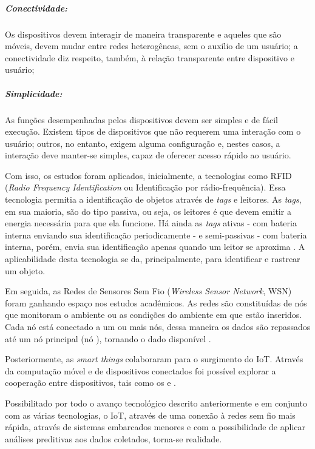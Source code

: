 \subparagraph{Conectividade:} 

Os dispositivos devem interagir de maneira transparente
e aqueles que são móveis, devem mudar entre redes heterogêneas, sem o 
auxílio de um usuário; a conectividade diz respeito, também, à relação 
transparente entre dispositivo e usuário; 

\subparagraph{Simplicidade:} 

As funções desempenhadas pelos dispositivos devem ser
simples e de fácil execução. Existem tipos de dispositivos que não requerem 
uma interação com o usuário; outros, no entanto, exigem alguma configuração e,
nestes casos, a interação deve manter-se simples, capaz de oferecer acesso
rápido ao usuário. 

Com isso, os estudos foram aplicados, inicialmente, a tecnologias como RFID
(\textit{Radio Frequency Identification} ou Identificação por
rádio-frequência).  Essa tecnologia permitia a identificação de objetos através
de \textit{tags} e leitores. As \textit{tags}, em sua maioria, são do tipo
passiva, ou seja, os leitores é que devem emitir a energia necessária para que
ela funcione. Há ainda as \textit{tags} ativas - com bateria interna enviando
sua identificação periodicamente - e semi-passivas - com bateria interna,
porém, envia sua identificação apenas quando um leitor se aproxima
\cite{want2006introduction}. A aplicabilidade desta tecnologia se da, 
principalmente, para identificar e rastrear um objeto.


Em seguida, as Redes de Sensores Sem Fio (\textit{Wireless Sensor Network}, WSN)
foram ganhando espaço nos estudos acadêmicos. As redes são constituídas de nós
que monitoram o ambiente ou as condições do ambiente em que estão inseridos.
Cada nó está conectado a um ou mais nós, dessa maneira os dados são repassados
até um nó principal (nó \gateway), tornando o dado disponível
\cite{lewis2004wireless}.

Posteriormente, as \textit{smart things} colaboraram para o surgimento do IoT.
Através da computação móvel e de dispositivos conectados foi possível explorar
a cooperação entre dispositivos, tais como os \smartphones[] e \smartwatches.

Possibilitado por todo o avanço tecnológico descrito anteriormente e em
conjunto com as várias tecnologias, o IoT, através de uma conexão à redes sem
fio mais rápida, através de sistemas embarcados menores e com a possibilidade
de aplicar análises preditivas aos dados coletados, torna-se realidade.

